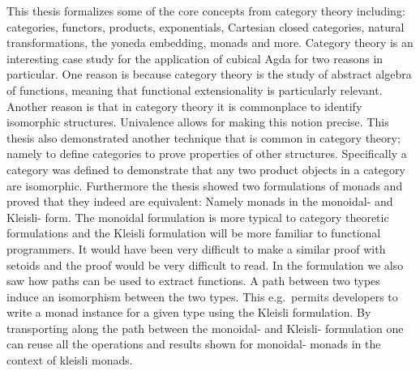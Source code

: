 This thesis formalizes some of the core concepts from category theory
including: categories, functors, products, exponentials, Cartesian
closed categories, natural transformations, the yoneda embedding,
monads and more.  Category theory is an interesting case study for the
application of cubical Agda for two reasons in particular. One reason
is because category theory is the study of abstract algebra of
functions, meaning that functional extensionality is particularly
relevant.  Another reason is that in category theory it is commonplace
to identify isomorphic structures.  Univalence allows for making this
notion precise.  This thesis also demonstrated another technique that
is common in category theory; namely to define categories to prove
properties of other structures.  Specifically a category was defined
to demonstrate that any two product objects in a category are
isomorphic.  Furthermore the thesis showed two formulations of monads
and proved that they indeed are equivalent: Namely monads in the
monoidal- and Kleisli- form.  The monoidal formulation is more typical
to category theoretic formulations and the Kleisli formulation will be
more familiar to functional programmers.  It would have been very
difficult to make a similar proof with setoids and the proof would be
very difficult to read.  In the formulation we also saw how paths can
be used to extract functions.  A path between two types induce an
isomorphism between the two types.  This e.g.\ permits developers to
write a monad instance for a given type using the Kleisli formulation.
By transporting along the path between the monoidal- and Kleisli-
formulation one can reuse all the operations and results shown for
monoidal- monads in the context of kleisli monads.
